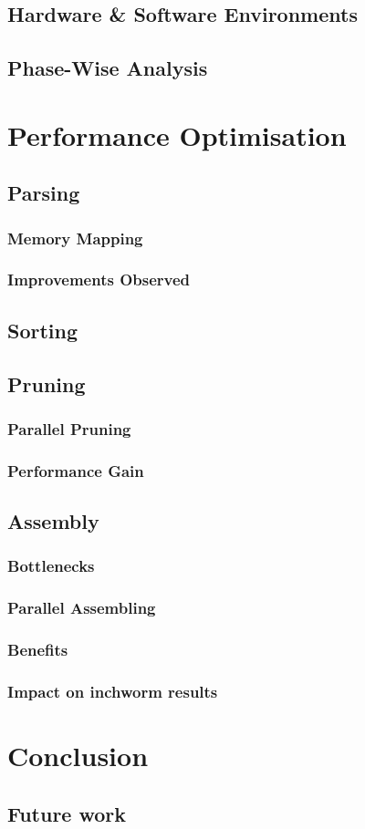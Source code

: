 \documentclass[plainarticle,zihtitle,english,final,hyperref,utf8]{zihpub}
\begin{document}
\subsection{Hardware \& Software Environments}
\subsection{Phase-Wise Analysis}

\section{Performance Optimisation}
\subsection{Parsing}
\subsubsection{Memory Mapping}
\subsubsection{Improvements Observed}
\subsection{Sorting}
\subsection{Pruning}
\subsubsection{Parallel Pruning}
\subsubsection{Performance Gain}
\subsection{Assembly}
\subsubsection{Bottlenecks}
\subsubsection{Parallel Assembling}
\subsubsection{Benefits}
\subsubsection{Impact on inchworm results}

\section{Conclusion}
\subsection{Future work}
\end{document}
